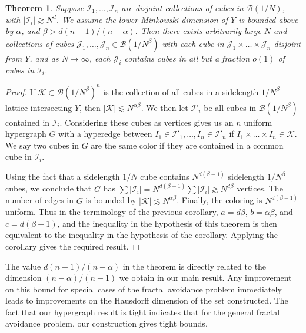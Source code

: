 \documentclass{article}
\theoremstyle{plain}
\theoremstyle{plain}
\newtheorem{theorem}{Theorem}
\begin{document}
\begin{theorem}
	Suppose $\mathcal{I}_1, \dots, \mathcal{I}_n$ are disjoint collections of cubes in $\mathcal{B}(1/N)$, with $|\mathcal{I}_i| \gtrsim N^d$. We assume the lower Minkowski dimension of $Y$ is bounded above by $\alpha$, and $\beta > d(n-1)/(n-\alpha)$. Then there exists arbitrarily large $N$ and collections of cubes $\mathcal{J}_1, \dots, \mathcal{J}_n \in \mathcal{B}(1/N^\beta)$ with each cube in $\mathcal{J}_1 \times \dots \times \mathcal{J}_n$ disjoint from $Y$, and as $N \to \infty$, each $\mathcal{J}_i$ contains cubes in all but a fraction $o(1)$ of cubes in $\mathcal{I}_i$.
\end{theorem}
\begin{proof}
	If $\mathcal{K} \subset \mathcal{B}(1/N^\beta)^n$ is the collection of all cubes in a sidelength $1/N^\beta$ lattice intersecting $Y$, then $|\mathcal{K}| \lesssim N^{\alpha \beta}$. We then let $\mathcal{I}'_i$ be all cubes in $\mathcal{B}(1/N^\beta)$ contained in $\mathcal{I}_i$. Considering these cubes as vertices gives us an $n$ uniform hypergraph $G$ with a hyperedge between $I_1 \in \mathcal{I}'_1, \dots, I_n \in \mathcal{I}'_n$ if $I_1 \times \dots \times I_n \in \mathcal{K}$. We say two cubes in $G$ are the same color if they are contained in a common cube in $\mathcal{I}_i$.

	Using the fact that a sidelength $1/N$ cube contains $N^{d(\beta - 1)}$ sidelength $1/N^\beta$ cubes, we conclude that $G$ has $\sum |\mathcal{I}_i| = N^{d(\beta - 1)} \sum |\mathcal{I}_i| \gtrsim N^{d \beta}$ vertices. The number of edges in $G$ is bounded by $|\mathcal{K}| \lesssim N^{\alpha \beta}$. Finally, the coloring is $N^{d(\beta - 1)}$ uniform. Thus in the terminology of the previous corollary, $a = d \beta$, $b = \alpha \beta$, and $c = d(\beta - 1)$, and the inequality in the hypothesis of this theorem is then equivalent to the inequality in the hypothesis of the corollary. Applying the corollary gives the required result.
\end{proof}

The value $d(n-1)/(n-\alpha)$ in the theorem is directly related to the dimension $(n-\alpha)/(n-1)$ we obtain in our main result. Any improvement on this bound for special cases of the fractal avoidance problem immediately leads to improvements on the Hausdorff dimension of the set constructed. The fact that our hypergraph result is tight indicates that for the general fractal avoidance problem, our construction gives tight bounds.

\end{document}
